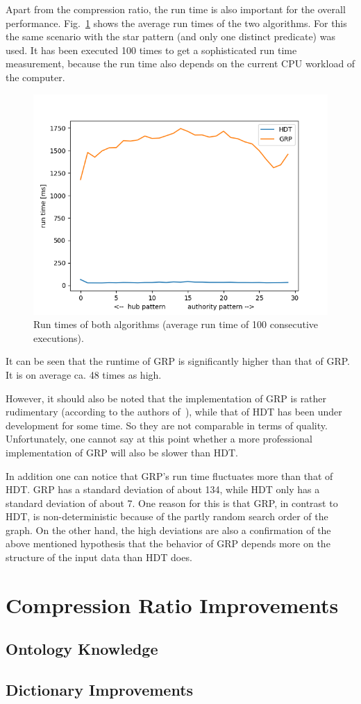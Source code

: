 Apart from the compression ratio, the run time is also important for the overall performance. Fig.~\ref{fig:runtimes} shows the average run times of the two algorithms. For this the same scenario with the star pattern (and only one distinct predicate) was used. It has been executed 100 times to get a sophisticated run time measurement, because the run time also depends on the current CPU workload of the computer.

\begin{figure}
	\centering
	\includegraphics[width=0.7\linewidth]{figures/GRPvsHDT/runtimes}
	\caption{Run times of both algorithms (average run time of 100 consecutive executions).}
	\label{fig:runtimes}
\end{figure}


It can be seen that the runtime of GRP is significantly higher than that of GRP. It is on average ca. 48 times as high.

However, it should also be noted that the implementation of GRP is rather rudimentary  (according to the authors of~\cite{maneth}), while that of HDT has been under development for some time. So they are not comparable in terms of quality. Unfortunately, one cannot say at this point whether a more professional implementation of GRP will also be slower than HDT.

In addition one can notice that GRP's run time fluctuates more than that of HDT. GRP has a standard deviation of about 134, while HDT only has a standard deviation of about 7. One reason for this is that GRP, in contrast to HDT, is non-deterministic because of the partly random search order of the graph. On the other hand, the high deviations are also a confirmation of the above mentioned hypothesis that the behavior of GRP depends more on the structure of the input data than HDT does.



\section{Compression Ratio Improvements}

\subsection{Ontology Knowledge}\label{sec:evaluationOntKnowledge}

\subsection{Dictionary Improvements}\label{sec:evaluationDictImprovements}
















